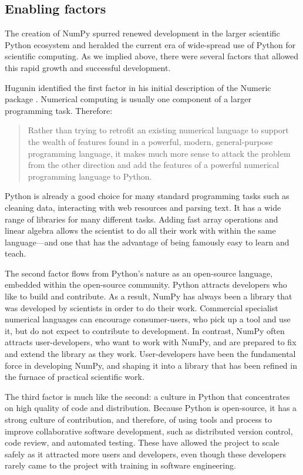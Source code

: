 \subsection{Enabling factors}

The creation of NumPy spurred renewed development in the larger scientific
Python ecosystem and heralded the current era of wide-spread use of Python for
scientific computing.
As we implied above, there were several factors that allowed this rapid growth
and successful development.

Hugunin identified the first factor in his initial description of the Numeric
package \cite{Hugunin-whitepaper}.  Numerical computing is usually one
component of a larger programming task.  Therefore:

\begin{quote}
    Rather than trying to retrofit an existing numerical language to support
    the wealth of features found in a powerful, modern, general-purpose
    programming language, it makes much more sense to attack the problem from
    the other direction and add the features of a powerful numerical
    programming language to Python.
\end{quote}

Python is already a good choice for many standard programming tasks such as
cleaning data, interacting with web resources and parsing text.  It has a wide
range of libraries for many different tasks. Adding fast array operations and
linear algebra allows the scientist to do all their work with within the same
language---and one that has the advantage of being famously easy to learn and
teach.

The second factor flows from Python's nature as an open-source language,
embedded within the open-source community.  Python attracts developers who like
to build and contribute.  As a result, NumPy has always been a library that was
developed by scientists in order to do their work.  Commercial specialist
numerical languages can encourage consumer-users, who pick up a tool and use
it, but do not expect to contribute to development.  In contrast, NumPy often
attracts user-developers, who want to work with NumPy, and are prepared to fix
and extend the library as they work. User-developers have been the fundamental
force in developing NumPy, and shaping it into a library that has been refined
in the furnace of practical scientific work.

The third factor is much like the second: a culture in Python that concentrates
on high quality of code and distribution. Because Python is open-source, it has
a strong culture of contribution, and therefore, of using tools and process to
improve collaborative software development, such as distributed version
control, code review, and automated testing.  These have allowed the project to
scale safely as it attracted more users and developers, even though these
developers rarely came to the project with training in software engineering.

